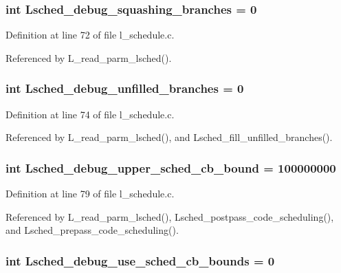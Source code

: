 \subsubsection{\setlength{\rightskip}{0pt plus 5cm}int \bf{Lsched\_\-debug\_\-squashing\_\-branches} = 0}\label{l__schedule_8c_edb9555f6c00ca8943e8a8a058731e68}




Definition at line 72 of file l\_\-schedule.c.

Referenced by L\_\-read\_\-parm\_\-lsched().
\subsubsection{\setlength{\rightskip}{0pt plus 5cm}int \bf{Lsched\_\-debug\_\-unfilled\_\-branches} = 0}\label{l__schedule_8c_4c875e480a2233a014e03f62cab39191}




Definition at line 74 of file l\_\-schedule.c.

Referenced by L\_\-read\_\-parm\_\-lsched(), and Lsched\_\-fill\_\-unfilled\_\-branches().
\subsubsection{\setlength{\rightskip}{0pt plus 5cm}int \bf{Lsched\_\-debug\_\-upper\_\-sched\_\-cb\_\-bound} = 100000000}\label{l__schedule_8c_e75029d0ece9ff7e181c53e7091e054c}




Definition at line 79 of file l\_\-schedule.c.

Referenced by L\_\-read\_\-parm\_\-lsched(), Lsched\_\-postpass\_\-code\_\-scheduling(), and Lsched\_\-prepass\_\-code\_\-scheduling().
\subsubsection{\setlength{\rightskip}{0pt plus 5cm}int \bf{Lsched\_\-debug\_\-use\_\-sched\_\-cb\_\-bounds} = 0}\label{l__schedule_8c_c3f7692f32a5f078bb087c6709be3dc6}




